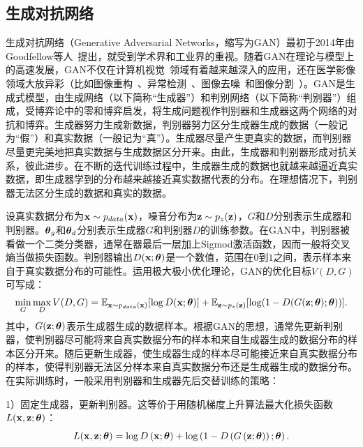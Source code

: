 \subsection{生成对抗网络}\label{subsec:gan_introduction}
生成对抗网络（Generative Adversarial Networks，缩写为GAN）最初于2014年由Goodfellow等人~\cite{goodfellow2014generative}提出，就受到学术界和工业界的重视。随着GAN在理论与模型上的高速发展，GAN不仅在计算机视觉~\cite{zhu2017unpaired}领域有着越来越深入的应用，还在医学影像领域大放异彩（比如图像重构~\cite{bhadra2020medical}、异常检测~\cite{Kohl2017AdversarialNF}、图像去噪~\cite{Yang2018LowDoseCI}和图像分割~\cite{Han2018SpineGANSS}）。GAN是生成式模型，由生成网络（以下简称“生成器”）和判别网络（以下简称“判别器”）组成，受博弈论中的零和博弈启发，将生成问题视作判别器和生成器这两个网络的对抗和博弈。生成器努力生成新数据，判别器努力区分生成器生成的数据（一般记为“假”）和真实数据（一般记为“真”）。生成器尽量产生更真实的数据，而判别器尽量更完美地把真实数据与生成数据区分开来。由此，生成器和判别器形成对抗关系，彼此进步。在不断的迭代训练过程中，生成器生成的数据也就越来越逼近真实数据，即生成器学到的分布越来越接近真实数据代表的分布。在理想情况下，判别器无法区分生成的数据和真实的数据。

设真实数据分布为$\mathbf{x}\sim p_{{data}}(\mathbf{x})$，噪音分布为$\mathbf{z}\sim p_{{z}}(\mathbf{z})$，$G$和$D$分别表示生成器和判别器。$\mbox{\boldmath $\theta$}_{g}$和$\mbox{\boldmath $\theta$}_{d}$分别表示生成器$G$和判别器$D$的训练参数。在GAN中，判别器被看做一个二类分类器，通常在器最后一层加上Sigmod激活函数，因而一般将交叉熵当做损失函数。判别器输出$D(\mathbf{x};\mbox{\boldmath $\theta$})$是一个数值，范围在$0$到$1$之间，表示样本来自于真实数据分布的可能性。运用极大极小优化理论，GAN的优化目标$V(D, G)$可写成：
\begin{eqnarray}\label{equ:gan_loss_func}
\min _{G} \max _{D} V(D, G)=\mathbb{E}_{ \mathbf{x} \sim {p}_{ {data }}(\mathbf{x})}[\log D(\mathbf{x};\mbox{\boldmath $\theta$})]+\mathbb{E}_{\mathbf{z} \sim {p}_{{z}}(\mathbf{z})}[\log (1-D(G(\mathbf{z};\mbox{\boldmath $\theta$});\mbox{\boldmath $\theta$}))].
\end{eqnarray}
\noindent 其中，$G(\mathbf{z};\mbox{\boldmath $\theta$})$表示生成器生成的数据样本。根据GAN的思想，通常先更新判别器，使判别器尽可能将来自真实数据分布的样本和来自生成器生成的数据分布的样本区分开来。随后更新生成器，使生成器生成的样本尽可能接近来自真实数据分布的样本，使得判别器无法区分样本来自真实数据分布还是生成器生成的数据分布。在实际训练时，一般采用判别器和生成器先后交替训练的策略：


1）固定生成器，更新判别器。这等价于用随机梯度上升算法最大化损失函数$L(\mathbf{x},\mathbf{z};\mbox{\boldmath $\theta$})$：
\begin{equation}
L(\mathbf{x},\mathbf{z};\mbox{\boldmath $\theta$})=\log D\left(\mathbf{x};\mbox{\boldmath $\theta$}\right)+\log \left(1-D\left(G\left(\mathbf{z};\mbox{\boldmath $\theta$}\right)\right);\mbox{\boldmath $\theta$}\right).
\end{equation}
	
